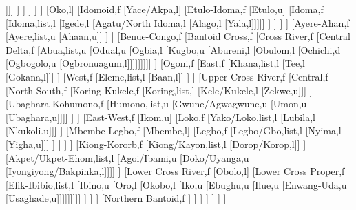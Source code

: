 \documentclass[landscape]{standalone}
\begin{document}
\begin{forest}
											[Kakanda,l
											[Kami,u
											[Kupa,l]]]]
										]%
									]%
								]%
							]%
						]%
						[Oko,l]
						[Idomoid,f
							[Yace/Akpa,l]
							[Etulo-Idoma,f
								[Etulo,u]
								[Idoma,f
									[Idoma,list,l
									[Igede,l
									[Agatu/North Idoma,l
									[Alago,l
									[Yala,l]]]]]
								]%
							]%
						]%
					]%
					[Ayere-Ahan,f
						[Ayere,list,u
						[Ahaan,u]]
					]%
				]%
				[Benue-Congo,f
					[Bantoid Cross,f
						[Cross River,f
							[Central Delta,f
								[Abua,list,u
								[Odual,u
								[Ogbia,l
								[Kugbo,u
								[Abureni,l
								[Obulom,l
								[Ochichi,d
								[Ogbogolo,u
								[Ogbronuagum,l]]]]]]]]]
							]%
							[Ogoni,f
								[East,f
									[Khana,list,l
									[Tee,l
									[Gokana,l]]]
								]%
								[West,f
									[Eleme,list,l
									[Baan,l]]
								]%
							]%
							[Upper Cross River,f
								[Central,f
									[North-South,f
										[Koring-Kukele,f
											[Koring,list,l
											[Kele/Kukele,l
											[Zekwe,u]]]
										]%
										[Ubaghara-Kohumono,f
											[Humono,list,u
											[Gwune/Agwagwune,u
											[Umon,u
											[Ubaghara,u]]]]
										]%
									]%
									[East-West,f
										[Ikom,u]
										[Loko,f
											[Yako/Loko,list,l
											[Lubila,l
											[Nkukoli.u]]]
										]%
										[Mbembe-Legbo,f
											[Mbembe,l]
											[Legbo,f
												[Legbo/Gbo,list,l
												[Nyima,l
												[Yigha,u]]]
											]%
										]%
									]%
								]%
								[Kiong-Kororb,f
									[Kiong/Kayon,list,l
									[Dorop/Korop,l]]
								]%
								[Akpet/Ukpet-Ehom,list,l
								[Agoi/Ibami,u
								[Doko/Uyanga,u
								[Iyongiyong/Bakpinka,l]]]]
							]%
							[Lower Cross River,f
								[Obolo,l]
								[Lower Cross Proper,f
									[Efik-Ibibio,list,l
									[Ibino,u
									[Oro,l
									[Okobo,l
									[Iko,u
									[Ebughu,u
									[Ilue,u
									[Enwang-Uda,u
									[Usaghade,u]]]]]]]]]
								]%
							]%
						]%
						[Northern Bantoid,f
						]%
					]%
				]%
			]%
		]%
	]%
]%
\end{forest}
\end{document}
